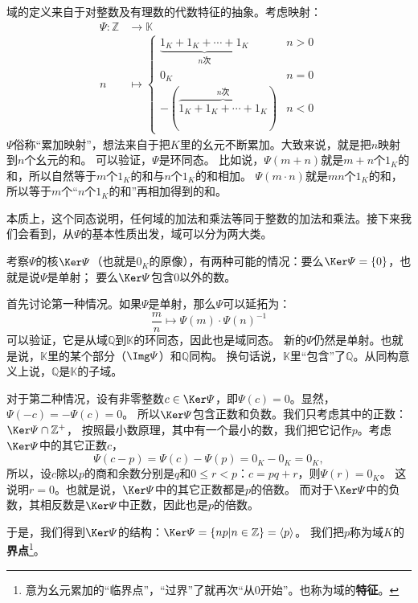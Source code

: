 \documentclass[12pt,UTF8]{ctexbook}
\begin{document}
\begin{appendix}
域的定义来自于对整数及有理数的代数特征的抽象。考虑映射：
\begin{align*}
    \varPsi : \mathbb{Z} &\rightarrow \mathbb{K}   \\
    n &\mapsto \left\{\begin{array}{rr}\underbrace{1_{K} + 1_{K} + \cdots + 1_{K}}_{n\mbox{次}} & n > 0 \\ 0_{K} & n = 0\\ -(\overbrace{1_{K} + 1_{K} + \cdots + 1_{K}}^{n\mbox{次}}) & n < 0  \end{array} \right.
\end{align*}
$\varPsi$俗称“累加映射”，想法来自于把$K$里的幺元不断累加。大致来说，就是把$n$映射到$n$个幺元的和。
可以验证，$\varPsi$是环同态。
比如说，$\varPsi(m+n)$就是$m+n$个$1_{K}$的和，所以自然等于$m$个$1_{K}$的和与$n$个$1_{K}$的和相加。
$\varPsi(m\cdot n)$就是$mn$个$1_{K}$的和，所以等于$m$个“$n$个$1_{K}$的和”再相加得到的和。

本质上，这个同态说明，任何域的加法和乘法等同于整数的加法和乘法。接下来我们会看到，从$\varPsi$的基本性质出发，域可以分为两大类。

考察$\varPsi$的核$\Ker \varPsi$（也就是$0_K$的原像），有两种可能的情况：要么$\Ker \varPsi = \{0\}$，也就是说$\varPsi$是单射；
要么$\Ker \varPsi$包含$0$以外的数。

首先讨论第一种情况。如果$\varPsi$是单射，那么$\varPsi$可以延拓为：
$$ \frac{m}{n} \mapsto \varPsi(m) \cdot \varPsi(n)^{-1} $$
可以验证，它是从域$\mathbb{Q}$到$\mathbb{K}$的环同态，因此也是域同态。
新的$\varPsi$仍然是单射。也就是说，$\mathbb{K}$里的某个部分（$\Img \varPsi$）和$\mathbb{Q}$同构。
换句话说，$\mathbb{K}$里“包含”了$\mathbb{Q}$。从同构意义上说，$\mathbb{Q}$是$\mathbb{K}$的子域。

对于第二种情况，设有非零整数$c \in \Ker \varPsi$，即$\varPsi(c) = 0$。显然，$\varPsi(-c) = -\varPsi(c) = 0$。
所以$\Ker \varPsi$包含正数和负数。我们只考虑其中的正数：$\Ker \varPsi \cap \mathbb{Z}^+$，
按照最小数原理，其中有一个最小的数，我们把它记作$p$。考虑$\Ker \varPsi$中的其它正数$c$，
$$\varPsi(c - p) = \varPsi(c) - \varPsi(p) = 0_{K} - 0_{K} = 0_{K},$$
所以，设$c$除以$p$的商和余数分别是$q$和$0\leqslant r<p$：$c = pq + r$，则$\varPsi(r) = 0_{K}$。
这说明$r = 0$。也就是说，$\Ker \varPsi$中的其它正数都是$p$的倍数。
而对于$\Ker \varPsi$中的负数，其相反数是$\Ker \varPsi$中正数，因此也是$p$的倍数。

于是，我们得到$\Ker \varPsi$的结构：$\Ker \varPsi = \{np | n\in \mathbb{Z}\} = \langle p \rangle$。
我们把$p$称为域$K$的\textbf{界点}\footnote{意为幺元累加的“临界点”，“过界”了就再次“从$0$开始”。也称为域的\textbf{特征}。}。


\end{appendix}
\end{document}
